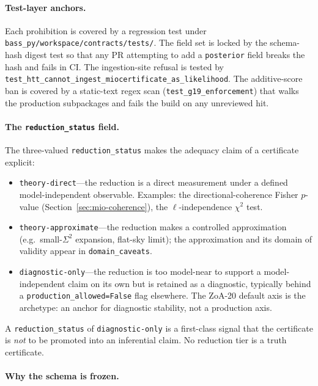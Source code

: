 \paragraph{Test-layer anchors.}

Each prohibition is covered by a regression test under
\texttt{bass\_py/workspace/contracts/tests/}.  The field set
is locked by the schema-hash digest test so that any PR
attempting to add a \texttt{posterior} field breaks the hash
and fails in CI.  The ingestion-site refusal is tested by
\texttt{test\_htt\_cannot\_ingest\_miocertificate\_as\_likelihood}.
The additive-score ban is covered by a static-text regex scan
(\texttt{test\_g19\_enforcement}) that walks the production
subpackages and fails the build on any unreviewed hit.


\paragraph{The \texttt{reduction\_status} field.}

The three-valued \texttt{reduction\_status} makes the
adequacy claim of a certificate explicit:

\begin{itemize}
\item \texttt{theory-direct}---the reduction is a direct
  measurement under a defined model-independent observable.
  Examples: the directional-coherence Fisher $p$-value
  (Section~\ref{sec:mio-coherence}), the
  $\ell$-independence $\chi^2$ test.
\item \texttt{theory-approximate}---the reduction makes a
  controlled approximation (e.g.\ small-$\Sigma^2$
  expansion, flat-sky limit); the approximation and its
  domain of validity appear in
  \texttt{domain\_caveats}.
\item \texttt{diagnostic-only}---the reduction is too
  model-near to support a model-independent claim on its
  own but is retained as a diagnostic, typically behind a
  \texttt{production\_allowed=False} flag elsewhere.  The
  ZoA-20\textdegree{} default axis is the archetype: an
  anchor for diagnostic stability, not a production axis.
\end{itemize}

A \texttt{reduction\_status} of \texttt{diagnostic-only} is
a first-class signal that the certificate is \emph{not} to
be promoted into an inferential claim.  No reduction tier is
a truth certificate.


\paragraph{Why the schema is frozen.}

